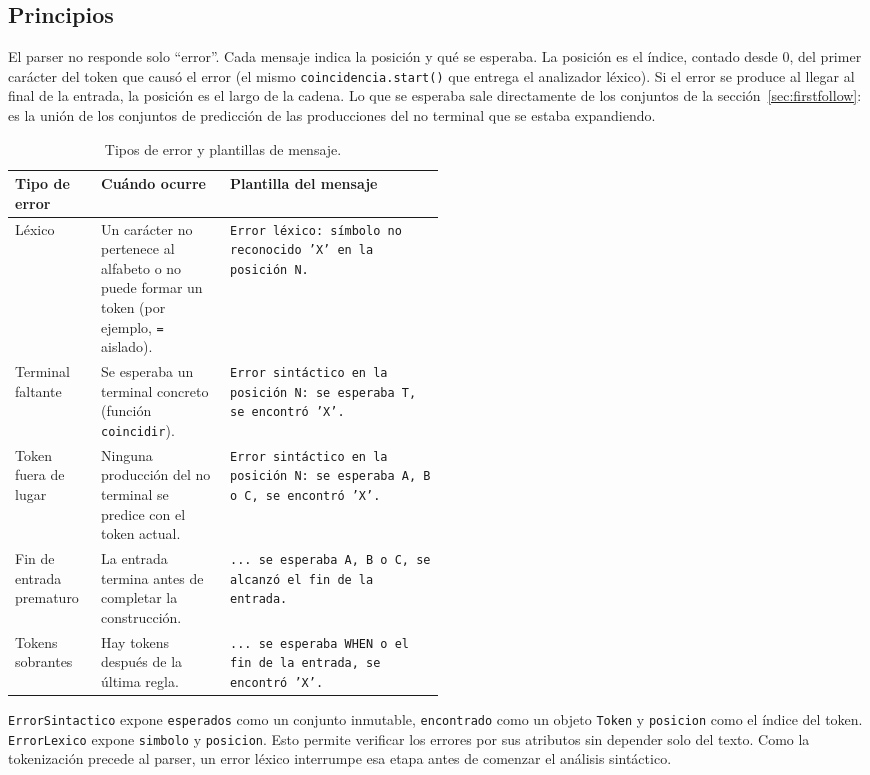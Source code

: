 \documentclass[10pt,a4paper]{article}
\newcommand{\tm}[1]{\texttt{#1}}                                          %
\begin{document}
\subsection{Principios}

El parser no responde solo ``error''. Cada mensaje indica la posición y qué se esperaba. La posición es el índice,
contado desde 0, del primer carácter del token que causó el error (el mismo \tm{coincidencia.start()} que entrega el
analizador léxico). Si el error se produce al llegar al final de la entrada, la posición es el largo de la cadena. Lo que
se esperaba sale directamente de los conjuntos de la sección~\ref{sec:firstfollow}: es la unión de los conjuntos de
predicción de las producciones del no terminal que se estaba expandiendo.

\begin{table}[H]
\centering\small
\begin{tabularx}{\linewidth}{|L{0.20\linewidth}|L{0.30\linewidth}|X|}
\hline
\textbf{Tipo de error} & \textbf{Cuándo ocurre} & \textbf{Plantilla del mensaje} \\
\hline
Léxico & Un carácter no pertenece al alfabeto o no puede formar un token (por ejemplo, \tm{=} aislado). & \tm{Error léxico: símbolo no reconocido 'X' en la posición N.} \\
\hline
Terminal faltante & Se esperaba un terminal concreto (función \tm{coincidir}). & \tm{Error sintáctico en la posición N: se esperaba T, se encontró 'X'.} \\
\hline
Token fuera de lugar & Ninguna producción del no terminal se predice con el token actual. & \tm{Error sintáctico en la posición N: se esperaba A, B o C, se encontró 'X'.} \\
\hline
Fin de entrada prematuro & La entrada termina antes de completar la construcción. & \tm{... se esperaba A, B o C, se alcanzó el fin de la entrada.} \\
\hline
Tokens sobrantes & Hay tokens después de la última regla. & \tm{... se esperaba WHEN o el fin de la entrada, se encontró 'X'.} \\
\hline
\end{tabularx}
\caption{Tipos de error y plantillas de mensaje.}
\label{tab:errores}
\end{table}

\tm{ErrorSintactico} expone \tm{esperados} como un conjunto inmutable, \tm{encontrado} como un objeto \tm{Token} y \tm{posicion} como el índice del token. \tm{ErrorLexico} expone \tm{simbolo} y \tm{posicion}. Esto permite verificar los errores por sus atributos sin depender solo del texto. Como la tokenización precede al parser, un error léxico interrumpe esa etapa antes de comenzar el análisis sintáctico.
\end{document}
